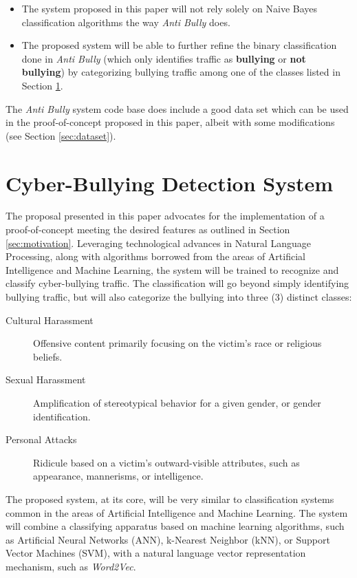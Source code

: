 \documentclass[conference]{sig-alternate-05-2015}
\begin{document}
\begin{itemize}
  \item The system proposed in this paper will not rely solely on Naive Bayes
  classification algorithms the way \textit{Anti Bully} does.
  \item The proposed system will be able to further refine the binary
  classification done in \textit{Anti Bully} (which only identifies traffic as
  \textbf{bullying} or \textbf{not bullying}) by categorizing bullying traffic
  among one of the classes listed in Section \ref{sec:design}.
\end{itemize}

The \textit{Anti Bully} system code base does include a good data set which can
be used in the proof-of-concept proposed in this paper, albeit with some
modifications (see Section \ref{sec:dataset}).

\section{Cyber-Bullying Detection System}\label{sec:design}
The proposal presented in this paper advocates for the implementation of a
proof-of-concept meeting the desired features as outlined in Section \ref{sec:motivation}.
Leveraging technological advances in Natural
Language Processing, along with algorithms borrowed from the areas of Artificial
Intelligence and Machine Learning, the system will be trained to recognize and
classify cyber-bullying traffic. The classification will go beyond simply
identifying bullying traffic, but will also categorize the bullying into three
(3) distinct classes:
\begin{description}
    \item[Cultural Harassment] Offensive content primarily focusing on the victim's race or religious beliefs.
    \item[Sexual Harassment] Amplification of stereotypical behavior for a given gender, or gender identification.
    \item[Personal Attacks] Ridicule based on a victim's outward-visible attributes, such as appearance, mannerisms, or intelligence.
\end{description}

The proposed system, at its core, will be very similar to classification systems
common in the areas of Artificial Intelligence and Machine Learning. The system
will combine a classifying apparatus based on machine learning algorithms, such as
Artificial Neural Networks (ANN), k-Nearest Neighbor (kNN), or Support Vector
Machines (SVM), with a natural language vector representation mechanism, such as
\textit{Word2Vec}.
\end{document}
